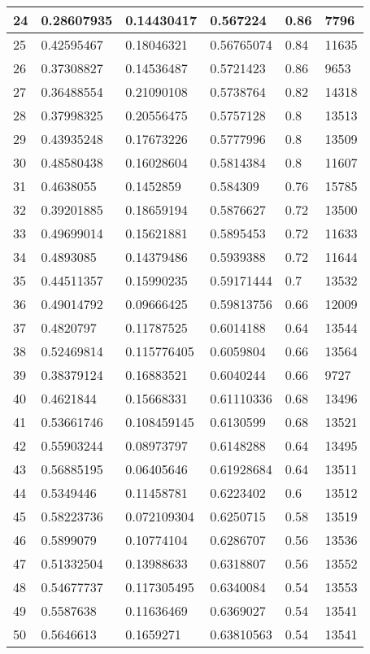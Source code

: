 \begin{longtable}{|l|l|l|l|l|l|}
24 & 0.28607935 & 0.14430417 & 0.567224 & 0.86 & 7796 \\ \hline 
25 & 0.42595467 & 0.18046321 & 0.56765074 & 0.84 & 11635 \\ \hline 
26 & 0.37308827 & 0.14536487 & 0.5721423 & 0.86 & 9653 \\ \hline 
27 & 0.36488554 & 0.21090108 & 0.5738764 & 0.82 & 14318 \\ \hline 
28 & 0.37998325 & 0.20556475 & 0.5757128 & 0.8 & 13513 \\ \hline 
29 & 0.43935248 & 0.17673226 & 0.5777996 & 0.8 & 13509 \\ \hline 
30 & 0.48580438 & 0.16028604 & 0.5814384 & 0.8 & 11607 \\ \hline 
31 & 0.4638055 & 0.1452859 & 0.584309 & 0.76 & 15785 \\ \hline 
32 & 0.39201885 & 0.18659194 & 0.5876627 & 0.72 & 13500 \\ \hline 
33 & 0.49699014 & 0.15621881 & 0.5895453 & 0.72 & 11633 \\ \hline 
34 & 0.4893085 & 0.14379486 & 0.5939388 & 0.72 & 11644 \\ \hline 
35 & 0.44511357 & 0.15990235 & 0.59171444 & 0.7 & 13532 \\ \hline 
36 & 0.49014792 & 0.09666425 & 0.59813756 & 0.66 & 12009 \\ \hline 
37 & 0.4820797 & 0.11787525 & 0.6014188 & 0.64 & 13544 \\ \hline 
38 & 0.52469814 & 0.115776405 & 0.6059804 & 0.66 & 13564 \\ \hline 
39 & 0.38379124 & 0.16883521 & 0.6040244 & 0.66 & 9727 \\ \hline 
40 & 0.4621844 & 0.15668331 & 0.61110336 & 0.68 & 13496 \\ \hline 
41 & 0.53661746 & 0.108459145 & 0.6130599 & 0.68 & 13521 \\ \hline 
42 & 0.55903244 & 0.08973797 & 0.6148288 & 0.64 & 13495 \\ \hline 
43 & 0.56885195 & 0.06405646 & 0.61928684 & 0.64 & 13511 \\ \hline 
44 & 0.5349446 & 0.11458781 & 0.6223402 & 0.6 & 13512 \\ \hline 
45 & 0.58223736 & 0.072109304 & 0.6250715 & 0.58 & 13519 \\ \hline 
46 & 0.5899079 & 0.10774104 & 0.6286707 & 0.56 & 13536 \\ \hline 
47 & 0.51332504 & 0.13988633 & 0.6318807 & 0.56 & 13552 \\ \hline 
48 & 0.54677737 & 0.117305495 & 0.6340084 & 0.54 & 13553 \\ \hline 
49 & 0.5587638 & 0.11636469 & 0.6369027 & 0.54 & 13541 \\ \hline 
50 & 0.5646613 & 0.1659271 & 0.63810563 & 0.54 & 13541 \\ \hline 
\end{longtable}